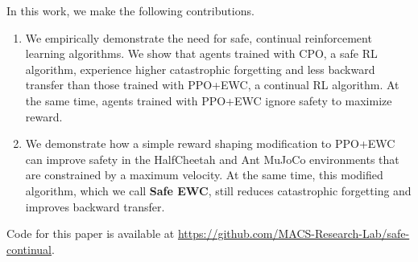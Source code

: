 In this work, we make the following contributions.

\begin{enumerate}
    \item We empirically demonstrate the need for safe, continual reinforcement learning algorithms. We show that agents trained with CPO, a safe RL algorithm, experience higher catastrophic forgetting and less backward transfer than those trained with PPO+EWC, a continual RL algorithm. At the same time, agents trained with PPO+EWC ignore safety to maximize reward. 
    \item We demonstrate how a simple reward shaping modification to PPO+EWC can improve safety in the HalfCheetah and Ant MuJoCo environments that are constrained by a maximum velocity. At the same time, this modified algorithm, which we call \textbf{Safe EWC}, still reduces catastrophic forgetting and improves backward transfer.
\end{enumerate}

Code for this paper is available at \url{https://github.com/MACS-Research-Lab/safe-continual}.
